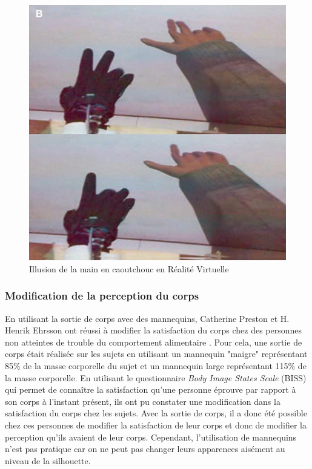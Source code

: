 \begin{figure}[!h]
   	\centerline{\includegraphics[scale=0.4]{./rhiRV}}
   	\caption{\label{fig3} Illusion de la main en caoutchouc en Réalité Virtuelle \cite{sl08}}
\end{figure}


\subsubsection{Modification de la perception du corps}

En utilisant la sortie de corps avec des mannequins, Catherine Preston et H. Henrik Ehrsson ont réussi à modifier la satisfaction du corps chez des personnes non atteintes de trouble du comportement alimentaire \cite{pr14}. Pour cela, une sortie de corps était réalisée sur les sujets en utilisant un mannequin "maigre" représentant 85\% de la masse corporelle du sujet et un mannequin large représentant 115\% de la masse corporelle. En utilisant le questionnaire \emph{Body Image States Scale} (BISS) \cite{ca02} qui permet de connaître la satisfaction qu'une personne éprouve par rapport à son corps à l'instant présent, ils ont pu constater une modification dans la satisfaction du corps chez les sujets. Avec la sortie de corps, il a donc été possible chez ces personnes de modifier la satisfaction de leur corps et donc de modifier la perception qu'ils avaient de leur corps. Cependant, l'utilisation de mannequins n'est pas pratique car on ne peut pas changer leurs apparences aisément au niveau de la silhouette. 

